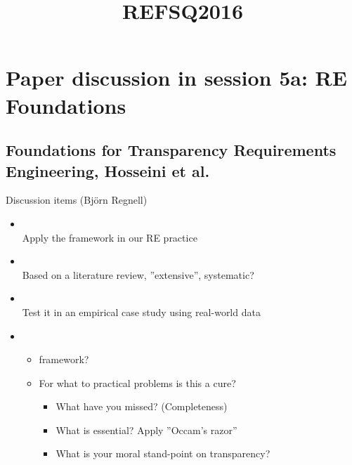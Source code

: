 \documentclass{slides}
\title{REFSQ2016}
\begin{document}
\section{Paper discussion in session 5a: RE Foundations}
\subsection{Foundations for Transparency Requirements Engineering, Hosseini et al.}

\begin{Slide}{Discussion items (Björn Regnell)}
\begin{itemize}
\item  {} \\ \pause
  Apply the framework in our RE practice
\pause\item  {} \\ \pause
  Based on a literature review, ''extensive'', systematic?
\pause\item    {} \\ \pause
        Test it in an empirical case study using real-world data
\pause\item    {} \\ \pause
\begin{itemize}
\item  {} framework?
\item  For what  to practical problems is this a cure?
\pause
\begin{itemize}
\item What have you missed? (Completeness)
\item What is essential? Apply ''Occam's razor''
\item What is your moral stand-point on transparency?
\end{itemize}
\end{itemize}
\end{itemize}

\end{Slide}
\end{document}
